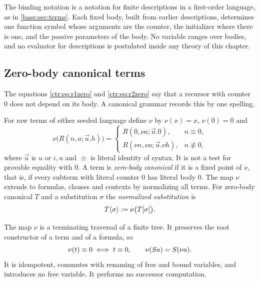 The binding notation is a notation for finite descriptions in a first-order language, as in
\cref{base:sec:terms}. Each fixed body, built from earlier descriptions, determines one
function symbol whose arguments are the counter, the initializer where there is one, and the
passive parameters of the body. No variable ranges over bodies, and no evaluator for
descriptions is postulated inside any theory of this chapter.

\subsection{Zero-body canonical terms}

The equations \eqref{ctr:eq:r1zero} and \eqref{ctr:eq:r2zero} say that a recursor with
counter $0$ does not depend on its body. A canonical grammar records this by one spelling.

\begin{definition}\label{ctr:def:nu}
For raw terms of either seeded language define $\nu$ by $\nu(x)=x$, $\nu(0)=0$ and
\[
 \nu\bigl(R(n,a;\vec u.h)\bigr)=
 \begin{cases}
  R(0,\nu a;\vec u.0), & n\equiv 0,\\
  R(\nu n,\nu a;\vec u.\nu h), & n\not\equiv 0,
 \end{cases}
\]
where $\vec u$ is $u$ or $i,u$ and $\equiv$ is literal identity of syntax. It is not a test
for provable equality with $0$. A term is \emph{zero-body canonical} if it is a fixed point of
$\nu$, that is, if every subterm with literal counter $0$ has literal body $0$. The map $\nu$
extends to formulas, clauses and contexts by normalizing all terms. For zero-body canonical
$T$ and a substitution $\sigma$ the \emph{normalized substitution} is
\[
 T\langle\sigma\rangle \mathrel{:=} \nu\bigl(T[\sigma]\bigr).
\]
\end{definition}

The map $\nu$ is a terminating traversal of a finite tree. It preserves the root constructor
of a term and of a formula, so
\begin{equation}\label{ctr:eq:nuroot}
 \nu(t)\equiv 0 \iff t\equiv 0,\qquad \nu(S a)=S(\nu a).
\end{equation}
It is idempotent, commutes with renaming of free and bound variables, and introduces no free
variable. It performs no successor computation.

